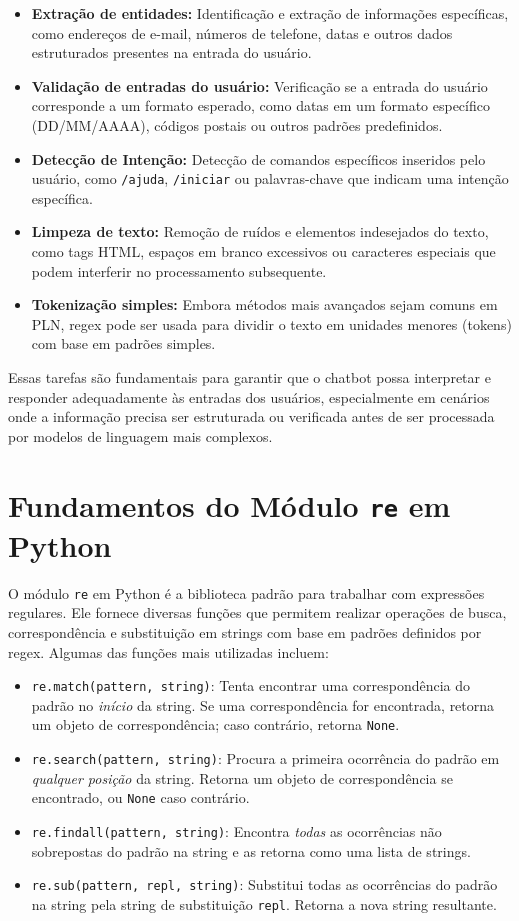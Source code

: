 \documentclass[14pt,a4paper,oneside]{book}
\begin{document}
\begin{itemize}
    \item \textbf{Extração de entidades:} Identificação e extração de informações específicas, como endereços de e-mail, números de telefone, datas e outros dados estruturados presentes na entrada do usuário.
    \item \textbf{Validação de entradas do usuário:} Verificação se a entrada do usuário corresponde a um formato esperado, como datas em um formato específico (DD/MM/AAAA), códigos postais ou outros padrões predefinidos.
    \item \textbf{Detecção de Intenção:} Detecção de comandos específicos inseridos pelo usuário, como \texttt{/ajuda}, \texttt{/iniciar} ou palavras-chave que indicam uma intenção específica.
    \item \textbf{Limpeza de texto:} Remoção de ruídos e elementos indesejados do texto, como tags HTML, espaços em branco excessivos ou caracteres especiais que podem interferir no processamento subsequente.
    \item \textbf{Tokenização simples:} Embora métodos mais avançados sejam comuns em PLN, regex pode ser usada para dividir o texto em unidades menores (tokens) com base em padrões simples.
\end{itemize}

Essas tarefas são fundamentais para garantir que o chatbot possa interpretar e responder adequadamente às entradas dos usuários, especialmente em cenários onde a informação precisa ser estruturada ou verificada antes de ser processada por modelos de linguagem mais complexos.

\section{Fundamentos do Módulo \texttt{re} em Python}

O módulo \texttt{re} em Python é a biblioteca padrão para trabalhar com expressões regulares. Ele fornece diversas funções que permitem realizar operações de busca, correspondência e substituição em strings com base em padrões definidos por regex. Algumas das funções mais utilizadas incluem:

\begin{itemize}
    \item \texttt{re.match(pattern, string)}: Tenta encontrar uma correspondência do padrão no \textit{início} da string. Se uma correspondência for encontrada, retorna um objeto de correspondência; caso contrário, retorna \texttt{None}.
    \item \texttt{re.search(pattern, string)}: Procura a primeira ocorrência do padrão em \textit{qualquer posição} da string. Retorna um objeto de correspondência se encontrado, ou \texttt{None} caso contrário.
    \item \texttt{re.findall(pattern, string)}: Encontra \textit{todas} as ocorrências não sobrepostas do padrão na string e as retorna como uma lista de strings.
    \item \texttt{re.sub(pattern, repl, string)}: Substitui todas as ocorrências do padrão na string pela string de substituição \texttt{repl}. Retorna a nova string resultante.
\end{itemize}
\end{document}
